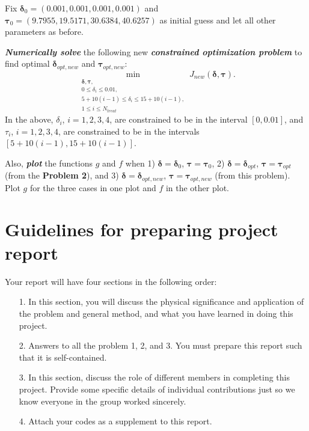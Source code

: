 \documentclass[11pt,a4paper]{article}
\newcommand{\bolds}[1]{\boldsymbol{#1}}
\newcommand{\bfit}[1]{\textit{\textbf{#1}}}
\begin{document}
Fix $\bolds{\delta}_0  = (0.001, 0.001, 0.001, 0.001)$ and $\bolds{\tau}_0 = (9.7955, 19.5171, 30.6384, 40.6257)$ as initial guess and let all other parameters as before. 

 \bfit{Numerically solve} the following new \bfit{constrained optimization problem} to find optimal $\bolds{\delta}_{opt, new}$ and $\bolds{\tau}_{opt, new}$:
\begin{equation}\label{eq:optProb2}
 \min_{\substack{\bolds{\delta}, \bolds{\tau},\\
0 \leq \delta_i \leq 0.01, \\
5 + 10(i-1) \leq \delta_i \leq 15 + 10(i-1), \\
1\leq i \leq N_{treat}}} J_{new}(\bolds{\delta}, \bolds{\tau}) .
\end{equation}
In the above, $\delta_i$, $i=1,2,3,4$, are constrained to be in the interval $[0, 0.01]$, and $\tau_i$, $i=1,2,3,4$, are constrained to be in the intervals $[5+10(i-1), 15+10(i-1)]$.

Also, \bfit{plot} the functions $g$ and $f$ when 1) $\bolds{\delta} = \bolds{\delta}_0$, $\bolds{\tau} = \bolds{\tau}_0$, 2)  $\bolds{\delta} = \bolds{\delta}_{opt}$, $\bolds{\tau} = \bolds{\tau}_{opt}$ (from the \textbf{Problem 2}), and 3) $\bolds{\delta} = \bolds{\delta}_{opt, new}$, $\bolds{\tau} = \bolds{\tau}_{opt, new}$ (from this problem).  Plot $g$ for the three cases in one plot and $f$  in the other plot. 

\section{Guidelines for preparing project report} 
Your report will have four sections in the following order:
\begin{itemize}
\item[1.] In this section, you will discuss the physical significance and application of the problem and general method, and what you have learned in doing this project.
\item[2.] Answers to all the problem 1, 2, and 3. You must prepare this report such that it is self-contained. 
\item[3.] In this section, discuss the role of different members in completing this project. Provide some specific details of individual contributions just so we know everyone in the group worked sincerely. 
\item[4.] Attach your codes as a supplement to this report.
\end{itemize}
\end{document}
